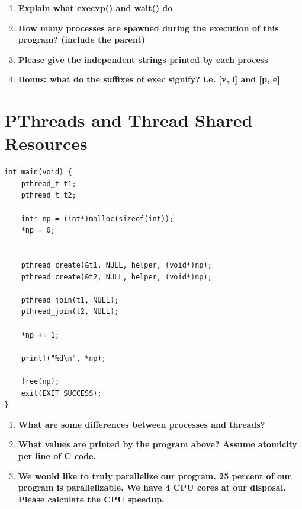 \documentclass[14pt, a4paper]{article}
\begin{document}
\begin{enumerate}

\item \textbf{Explain what execvp() and wait() do}

\vspace{15mm}

\item \textbf{How many processes are spawned during the execution of this program? (include the parent)}

\vspace{15mm}

\item \textbf{Please give the independent strings printed by each process}

\vspace{15mm}

\item \textbf{Bonus: what do the suffixes of exec signify? i.e. [v, l] and [p, e]}

\vspace{15mm}

\end{enumerate}

\newpage

\section{PThreads and Thread Shared Resources}

\begin{lstlisting}[style=cstyle]
int main(void) {
    pthread_t t1;
    pthread_t t2;

    int* np = (int*)malloc(sizeof(int));
    *np = 0;


    pthread_create(&t1, NULL, helper, (void*)np);
    pthread_create(&t2, NULL, helper, (void*)np);

    pthread_join(t1, NULL);
    pthread_join(t2, NULL);

    *np += 1;

    printf("%d\n", *np);

    free(np);
    exit(EXIT_SUCCESS);
}
\end{lstlisting}

\begin{enumerate}

\item \textbf{What are some differences between processes and threads?}

\vspace{15mm}

\item \textbf{What values are printed by the program above? Assume atomicity per line of C code.}

\vspace{15mm}

\item \textbf{We would like to truly parallelize our program. 25 percent of our program is parallelizable. We have 4 CPU cores at our disposal. Please calculate the CPU speedup.}

\vspace{15mm}

\end{enumerate}
\end{document}
